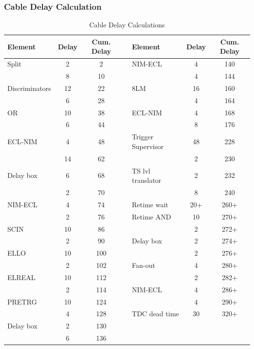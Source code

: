 \subsubsection{Cable Delay Calculation}

\begin{table}
\caption{Cable Delay Calculations\label{tab:delay_calc}}
\begin{center}
\begin{tabular}{lccllcc}
Element       &Delay&Cum. Delay&&Element           &Delay&Cum. Delay\\
\hline
Split         & 2   &         2&&NIM-ECL           &  4  & 140\\
              & 8   &        10&&                  &  4  & 144\\
Discriminators&12   &        22&&8LM               & 16  & 160\\
              & 6   &        28&&                  &  4  & 164\\
OR            &10   &        38&&ECL-NIM           &  4  & 168\\
              & 6   &        44&&                  &  8  & 176\\
ECL-NIM       & 4   &        48&&Trigger Supervisor& 48  & 228\\
              &14   &        62&&                  &  2  & 230\\
Delay box     & 6   &        68&&TS lvl translator &  2  & 232\\
              & 2   &        70&&                  &  8  & 240\\
NIM-ECL       & 4   &        74&&Retime wait       &20+  &260+\\
              & 2   &        76&&Retime AND        & 10  &270+\\
SCIN          &10   &        86&&                  &  2  &272+\\
              & 2   &        90&&Delay box         &  2  &274+\\
ELLO          &10   &       100&&                  &  2  &276+\\
              & 2   &       102&&Fan-out           &  4  &280+\\
ELREAL        &10   &       112&&                  &  2  &282+\\
              & 2   &       114&&NIM-ECL           &  4  &286+\\
PRETRG        &10   &       124&&                  &  4  &290+\\
              & 4   &       128&&TDC dead time     & 30  &320+\\
Delay box     & 2   &       130&&                  &     &    \\
              & 6   &       136&&                  &     &    \\
\end{tabular}
\end{center}
\end{table}

